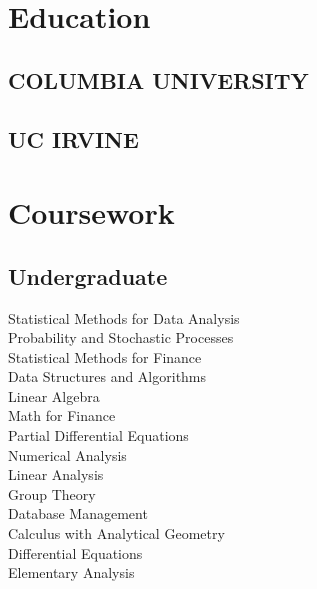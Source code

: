\documentclass[]{deedy-resume-openfont}
\begin{document}
%
%


%
%

\begin{minipage}[t]{0.33\textwidth} 


\section{Education} 

\subsection{COLUMBIA UNIVERSITY}
\sectionsep

\subsection{UC IRVINE}
\sectionsep


\section{Coursework}
\subsection{Undergraduate} 
Statistical Methods for Data Analysis \\
Probability and Stochastic Processes \\
Statistical Methods for Finance \\
Data Structures and Algorithms  \\
Linear Algebra \\
Math for Finance \\ 
Partial Differential Equations \\
Numerical Analysis \\
Linear Analysis \\
Group Theory \\
Database Management \\
Calculus with Analytical Geometry \\
Differential Equations \\
Elementary Analysis
\sectionsep


\end{minipage}
\end{document}
